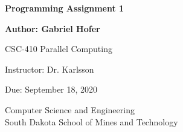 \documentclass[12pt]{article}
\begin{document}
\begin{titlepage}
   \begin{center}
       \vspace*{1cm}
       \large
       \textbf{Programming Assignment 1}
       \normalsize

       \vspace{0.5cm}

       \textbf{Author: Gabriel Hofer}

       \vspace{0.5cm}

       CSC-410 Parallel Computing 

       \vspace{0.5cm}

       Instructor: Dr. Karlsson

       \vspace{0.5cm}

       Due: September 18, 2020

       \vfill

       Computer Science and Engineering\\
       South Dakota School of Mines and Technology\\
   \end{center}
\end{titlepage}


\newpage
\end{document}
